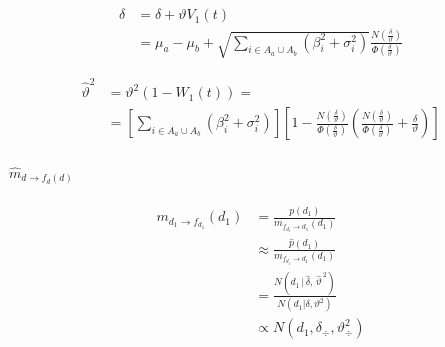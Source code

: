 \documentclass[11pt,twoside,spanish]{report} %
\begin{document}
\begin{equation}
	\begin{split}
		\widehat{\delta} &= \delta+\vartheta V_1(t) \\
		& = \mu_{a}-\mu_{b}+\sqrt{\sum_{i\in A_{a}\cup A_{b}}(\beta_i^2+\sigma_i^2)}\frac{N(\frac{\delta}{\vartheta})}{\Phi(\frac{\delta}{\vartheta})}
	\end{split}
\end{equation}

\begin{equation}
	\begin{split}
		\widehat{\vartheta}^2 &= \vartheta^2(1-W_1(t)) = \\
		&=\left[\sum_{i\in A_{a}\cup A_{b}}(\beta_i^2+\sigma_i^2)\right]\left[1-\frac{N(\frac{\delta}{\vartheta})}{\Phi(\frac{\delta}{\vartheta})}\left(\frac{N(\frac{\delta}{\vartheta})}{\Phi(\frac{\delta}{\vartheta})}+ \frac{\delta}{\vartheta}\right)\right]
	\end{split}
\end{equation}

\paragraph{$\widehat{m}_{d \rightarrow f_{d}(d)}$}

\begin{equation}\label{eq:m^_d_fd}
	\begin{split}
		m_{d_1 \rightarrow f_{d_1}}(d_1) &= \frac{p(d_1)}{m_{f_{d_1} \rightarrow d_1}(d_1)} \\
		&\approx \frac{\widehat{p}(d_1)}{m_{f_{d_1} \rightarrow d_1}(d_1)} \\
		& =  \frac{N(d_1 \,  | \,\widehat{\delta} , \, \widehat{\vartheta}^{\,2} )}{N(d_1 | \delta, \vartheta^2)} \\
		&\propto N(d_1,\delta_{\div},\vartheta_{\div}^2 )
	\end{split}
\end{equation}
\end{document}

